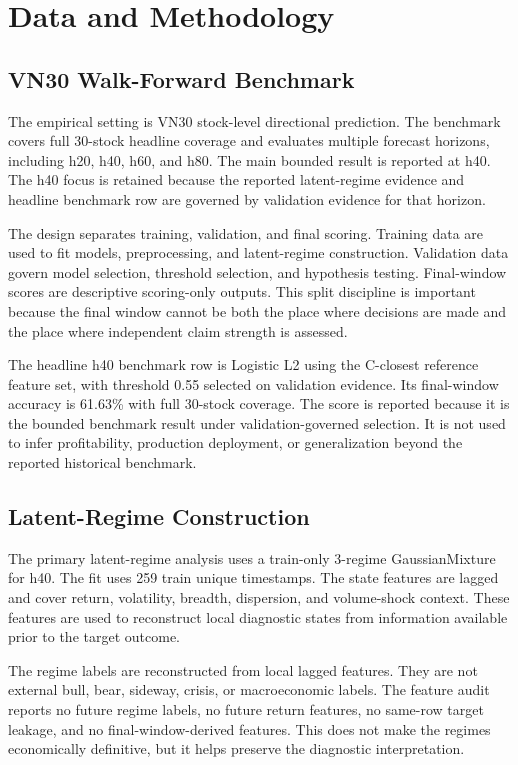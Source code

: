 \documentclass[12pt,a4paper]{article}
\begin{document}
\section{Data and Methodology}

\subsection{VN30 Walk-Forward Benchmark}

The empirical setting is VN30 stock-level directional prediction. The benchmark covers full 30-stock headline coverage and evaluates multiple forecast horizons, including h20, h40, h60, and h80. The main bounded result is reported at h40. The h40 focus is retained because the reported latent-regime evidence and headline benchmark row are governed by validation evidence for that horizon.

The design separates training, validation, and final scoring. Training data are used to fit models, preprocessing, and latent-regime construction. Validation data govern model selection, threshold selection, and hypothesis testing. Final-window scores are descriptive scoring-only outputs. This split discipline is important because the final window cannot be both the place where decisions are made and the place where independent claim strength is assessed.

The headline h40 benchmark row is Logistic L2 using the C-closest reference feature set, with threshold 0.55 selected on validation evidence. Its final-window accuracy is 61.63\% with full 30-stock coverage. The score is reported because it is the bounded benchmark result under validation-governed selection. It is not used to infer profitability, production deployment, or generalization beyond the reported historical benchmark.

\subsection{Latent-Regime Construction}

The primary latent-regime analysis uses a train-only 3-regime GaussianMixture for h40. The fit uses 259 train unique timestamps. The state features are lagged and cover return, volatility, breadth, dispersion, and volume-shock context. These features are used to reconstruct local diagnostic states from information available prior to the target outcome.

The regime labels are reconstructed from local lagged features. They are not external bull, bear, sideway, crisis, or macroeconomic labels. The feature audit reports no future regime labels, no future return features, no same-row target leakage, and no final-window-derived features. This does not make the regimes economically definitive, but it helps preserve the diagnostic interpretation.
\end{document}
